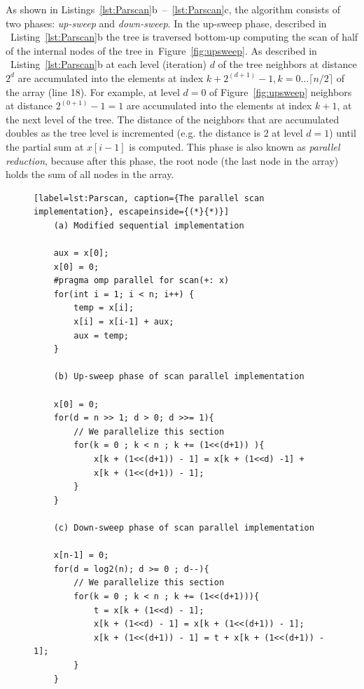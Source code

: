 \documentclass[Ingles]{ic-tese-v1}
\newcommand{\rfig}[1]{Figure~\ref{fig:#1}}
\newcommand{\rlsts}[2]{Listing~\ref{lst:#1}{#2}}
\newcommand{\rlstn}[3]{Listings~\ref{lst:#1}{#2}~--~\ref{lst:#1}{#3}}
\begin{document}
As  shown  in \rlstn{Parscan}{b}{c},  the  algorithm  consists of  two
phases:  \textit{up-sweep} and  \textit{down-sweep}.  In  the up-sweep
phase,  described   in  ~\rlsts{Parscan}{b}  the  tree   is  traversed
bottom-up computing the scan of half of the internal nodes of the tree
in~\rfig{upsweep}.  As described in  ~\rlsts{Parscan}{b} at each level
(iteration)  $d$  of   the  tree  neighbors  at   distance  $2^d$  are
accumulated       into        the       elements        at       index
$k + 2^{(d+1)} - 1, k = 0 \ldots \lceil n/2 \rceil$ of the array (line
18). For  example, at  level $d  = 0$  of \rfig{upsweep}  neighbors at
distance $2^{(0+1)}  - 1  = 1$  are accumulated  into the  elements at
index $k  + 1$, at the  next level of  the tree.  The distance  of the
neighbors  that  are   accumulated  doubles  as  the   tree  level  is
incremented  (e.g.  the  distance is  2 at  level $d  = 1$)  until the
partial sum  at $x[i-1]$  is computed.   This phase  is also  known as
\textit{parallel reduction},  because after this phase,  the root node
(the last node in the array) holds the sum of all nodes in the array.


\begin{figure}[t]
	\lstset{basicstyle=\scriptsize}
	\begin{lstlisting}[label=lst:Parscan, caption={The parallel scan implementation}, escapeinside={(*}{*)}]
	(a) Modified sequential implementation

	aux = x[0];
	x[0] = 0;
	#pragma omp parallel for scan(+: x)
	for(int i = 1; i < n; i++) {
		temp = x[i];
		x[i] = x[i-1] + aux;
		aux = temp;
	}

	(b) Up-sweep phase of scan parallel implementation

	x[0] = 0;
	for(d = n >> 1; d > 0; d >>= 1){
		// We parallelize this section
		for(k = 0 ; k < n ; k += (1<<(d+1)) ){
			x[k + (1<<(d+1)) - 1] = x[k + (1<<d) -1] +
			x[k + (1<<(d+1)) - 1];
		}
	}

	(c) Down-sweep phase of scan parallel implementation

	x[n-1] = 0;
	for(d = log2(n); d >= 0 ; d--){
		// We parallelize this section
		for(k = 0 ; k < n ; k += (1<<(d+1))){
			t = x[k + (1<<d) - 1];
			x[k + (1<<d) - 1] = x[k + (1<<(d+1)) - 1];
			x[k + (1<<(d+1)) - 1] = t + x[k + (1<<(d+1)) - 1];
		}
	}
	\end{lstlisting}
\end{figure}
\end{document}
